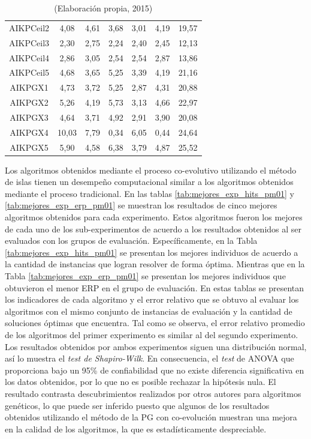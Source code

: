 \begin{table}[hbtp!]
\begin{center}
\begin{tabular}{c|cccccc}
AIKPCeil2 & 4,08 & 4,61 & 3,68 & 3,01 & 4,19 & 19,57 \\
AIKPCeil3 & 2,30 & 2,75 & 2,24 & 2,40 & 2,45 & 12,13 \\
AIKPCeil4 & 2,86 & 3,05 & 2,54 & 2,54 & 2,87 & 13,86 \\
AIKPCeil5 & 4,68 & 3,65 & 5,25 & 3,39 & 4,19 & 21,16 \\
AIKPGX1 & 4,73 & 3,72 & 5,25 & 2,87 & 4,31 & 20,88 \\
AIKPGX2 & 5,26 & 4,19 & 5,73 & 3,13 & 4,66 & 22,97 \\
AIKPGX3 & 4,64 & 3,71 & 4,92 & 2,91 & 3,90 & 20,08 \\
AIKPGX4 & 10,03 & 7,79 & 0,34 & 6,05 & 0,44 & 24,64 \\
AIKPGX5 & 5,90 & 4,58 & 6,38 & 3,79 & 4,87 & 25,52 \\
\hline
\end{tabular}
\end{center}
\caption*{(Elaboración propia, 2015)}
\end{table}

Los algoritmos obtenidos mediante el proceso co-evolutivo utilizando el método de islas tienen un desempeño computacional similar a los algoritmos obtenidos mediante el proceso tradicional. En las tablas \ref{tab:mejores_exp_hits_pm01} y \ref{tab:mejores_exp_erp_pm01} se muestran los resultados de cinco mejores algoritmos obtenidos para cada experimento. Estos algoritmos fueron los mejores de cada uno de los sub-experimentos de acuerdo a los resultados obtenidos al ser evaluados con los grupos de evaluación. Específicamente, en la Tabla \ref{tab:mejores_exp_hits_pm01} se presentan los mejores individuos de acuerdo a la cantidad de instancias que logran resolver de forma óptima. Mientras que en la Tabla \ref{tab:mejores_exp_erp_pm01} se presentan los mejores individuos que obtuvieron el menor ERP en el grupo de evaluación. En estas tablas se presentan los indicadores de cada algoritmo y el error relativo que se obtuvo al evaluar los algoritmos con el mismo conjunto de instancias de evaluación y la cantidad de soluciones óptimas que encuentra. Tal como se observa, el error relativo promedio de los algoritmos del primer experimento es similar al del segundo experimento. Los resultados obtenidos por ambos experimentos siguen una distribución normal, así lo muestra el \textit{test de Shapiro-Wilk}. En consecuencia,  el \textit{test} de ANOVA que proporciona bajo un 95\% de confiabilidad que no existe diferencia significativa en los datos obtenidos, por lo que no es posible rechazar la hipótesis nula. El resultado contrasta descubrimientos realizados por otros autores para algoritmos genéticos, lo que puede ser inferido puesto que algunos de los resultados obtenidos utilizando el método de la PG con co-evolución muestran una mejora en la calidad de los algoritmos, la que es estadísticamente despreciable.

